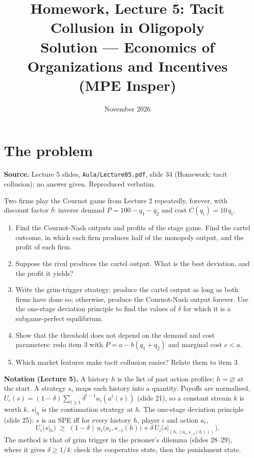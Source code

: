 \documentclass[11pt,a4paper]{article}
\title{\textbf{Homework, Lecture 5: Tacit Collusion in Oligopoly}\\[4pt]
  \large Solution --- Economics of Organizations and Incentives (MPE Insper)}
\date{November 2026}
\begin{document}
\maketitle
\thispagestyle{empty}

\section*{The problem}

\textbf{Source.} Lecture 5 slides, \texttt{Aula/Lecture05.pdf}, slide 34 (Homework: tacit
collusion); no answer given. Reproduced verbatim.

\begin{tcolorbox}[colback=src!4,colframe=src,boxrule=0.5pt]
Two firms play the Cournot game from Lecture 2 repeatedly, forever, with discount factor
$\delta$: inverse demand $P = 100 - q_1 - q_2$ and cost $C(q_i) = 10\,q_i$.
\begin{enumerate}[leftmargin=1.6em,itemsep=1pt]
\item Find the Cournot-Nash outputs and profits of the stage game. Find the cartel outcome, in which
each firm produces half of the monopoly output, and the profit of each firm.
\item Suppose the rival produces the cartel output. What is the best deviation, and the profit it yields?
\item Write the grim-trigger strategy: produce the cartel output as long as both firms have done so;
otherwise, produce the Cournot-Nash output forever. Use the one-stage deviation principle to find the
values of $\delta$ for which it is a subgame-perfect equilibrium.
\item Show that the threshold does not depend on the demand and cost parameters: redo item 3 with
$P = a - b(q_1 + q_2)$ and marginal cost $c < a$.
\item Which market features make tacit collusion easier? Relate them to item 3.
\end{enumerate}
\end{tcolorbox}

\textbf{Notation (Lecture 5).} A history $h$ is the list of past action profiles; $h = \varnothing$ at the
start. A strategy $s_i$ maps each history into a quantity. Payoffs are normalised,
$U_i(s) = (1-\delta)\sum_{t\ge1}\delta^{t-1}u_i(a^t(s))$ (slide 21), so a constant stream $k$ is worth
$k$. $s|_h$ is the continuation strategy at $h$. The one-stage deviation principle (slide 25): $s$ is
an SPE iff for every history $h$, player $i$ and action $a_i$,
\[
U_i(s|_h) \;\ge\; (1-\delta)\,u_i\bigl(a_i, s_{-i}(h)\bigr) + \delta\, U_i\bigl(s|_{(h,(a_i,s_{-i}(h)))}\bigr).
\]
The method is that of grim trigger in the prisoner's dilemma (slides 28--29), where it gives
$\delta \ge 1/4$: check the cooperative state, then the punishment state.
\end{document}

